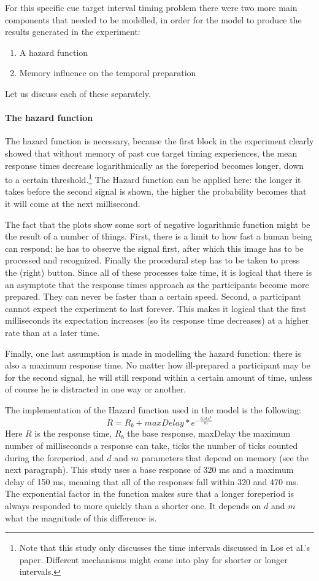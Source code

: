 \documentclass[10pt,letterpaper]{article}
\begin{document}
For this specific cue target interval timing problem there were two more main components that needed to be modelled, in order for the model to produce the results generated in the experiment:
\begin{enumerate}
	\item A hazard function
	\item Memory influence on the temporal preparation
\end{enumerate}
Let us discuss each of these separately.

\paragraph{The hazard function}
The hazard function is necessary, because the first block in the experiment clearly showed that without memory of past cue target timing experiences, the mean response times decrease logarithmically as the foreperiod becomes longer, down to a certain threshold.\footnote{Note that this study only discusses the time intervals discussed in Los et al.'s paper. Different mechanisms might come into play for shorter or longer intervals.} The Hazard function can be applied here: the longer it takes before the second signal is shown, the higher the probability becomes that it will come at the next millisecond. 

The fact that the plots show some sort of negative logarithmic function might be the result of a number of things. First, there is a limit to how fast a human being can respond: he has to observe the signal first, after which this image has to be processed and recognized. Finally the procedural step has to be taken to press the (right) button. Since all of these processes take time, it is logical that there is an asymptote that the response times approach as the participants become more prepared. They can never be faster than a certain speed. Second, a participant cannot expect the experiment to last forever. This makes it logical that the first milliseconds its expectation increases (so its response time decreases) at a higher rate than at a later time. 

Finally, one last assumption is made in modelling the hazard function: there is also a maximum response time. No matter how ill-prepared a participant may be for the second signal, he will still respond within a certain amount of time, unless of course he is distracted in one way or another.

The implementation of the Hazard function used in the model is the following:
\begin{equation}
	R = R_b + maxDelay * e^{-\frac{ticks^d}{m}}
\end{equation}
Here $R$ is the response time, $R_b$ the base response, maxDelay the maximum number of milliseconds a response can take, ticks the number of ticks counted during the foreperiod, and $d$ and $m$ parameters that depend on memory (see the next paragraph). This study uses a base response of 320 ms and a maximum delay of 150 ms, meaning that all of the responses fall within 320 and 470 ms. The exponential factor in the function makes sure that a longer foreperiod is always responded to more quickly than a shorter one. It depends on $d$ and $m$ what the magnitude of this difference is.
\end{document}
